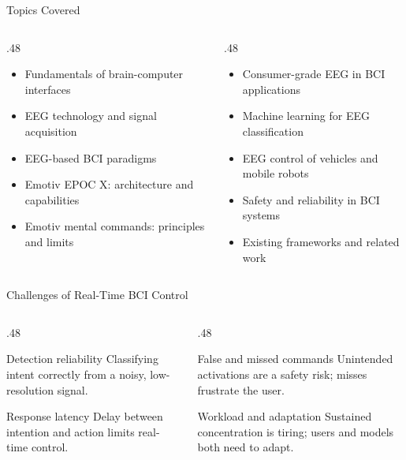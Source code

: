 \documentclass[aspectratio=169,11pt]{beamer}
\begin{document}
\begin{frame}{Topics Covered}
  \begin{columns}[T]
    \begin{column}{.48\textwidth}
      \begin{itemize}
        \item Fundamentals of brain-computer interfaces
        \item EEG technology and signal acquisition
        \item EEG-based BCI paradigms
        \item Emotiv EPOC X: architecture and capabilities
        \item Emotiv mental commands: principles and limits
      \end{itemize}
    \end{column}
    \begin{column}{.48\textwidth}
      \begin{itemize}
        \item Consumer-grade EEG in BCI applications
        \item Machine learning for EEG classification
        \item EEG control of vehicles and mobile robots
        \item Safety and reliability in BCI systems
        \item Existing frameworks and related work
      \end{itemize}
    \end{column}
  \end{columns}
\end{frame}

\begin{frame}{Challenges of Real-Time BCI Control}
  \begin{columns}[T]
    \begin{column}{.48\textwidth}
      \begin{block}{Detection reliability}
        Classifying intent correctly from a noisy, low-resolution signal.
      \end{block}
      \medskip
      \begin{block}{Response latency}
        Delay between intention and action limits real-time control.
      \end{block}
    \end{column}
    \begin{column}{.48\textwidth}
      \begin{block}{False and missed commands}
        Unintended activations are a safety risk; misses frustrate the user.
      \end{block}
      \medskip
      \begin{block}{Workload and adaptation}
        Sustained concentration is tiring; users and models both need to adapt.
      \end{block}
    \end{column}
  \end{columns}
\end{frame}
\end{document}
